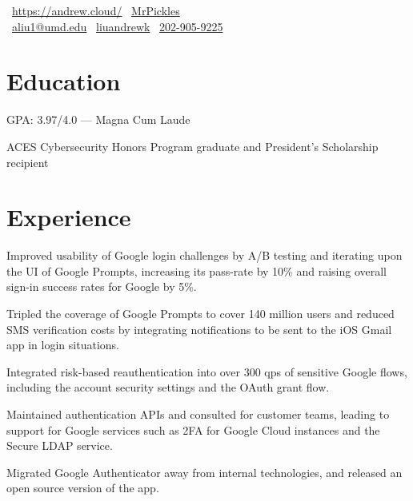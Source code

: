 \documentclass[]{template}
\begin{document}
\lastupdated

{
  \faHome \, \url{https://andrew.cloud/}
  \textcolor{black}{\textbullet}
  \faGithub \, \href{https://github.com/MrPickles}{MrPickles} \\
  \faEnvelope \, \href{mailto:aliu1@umd.edu}{aliu1@umd.edu}
  \textcolor{black}{\textbullet}
  \faLinkedin \, \href{https://linkedin.com/in/liuandrewk}{liuandrewk}
  \textcolor{black}{\textbullet}
  \faPhone \, \href{tel:2029059225}{202-905-9225}
}

\section{Education}
\begin{tightemize}
\item GPA: 3.97/4.0 --- Magna Cum Laude
\item ACES Cybersecurity Honors Program graduate and President's Scholarship recipient
\end{tightemize}
\sectionsep

\section{Experience}

\begin{tightemize}
\item Improved usability of Google login challenges by A/B testing and iterating upon the UI of Google Prompts, increasing its pass-rate by 10\% and raising overall sign-in success rates for Google by 5\%.
\item Tripled the coverage of Google Prompts to cover 140 million users and reduced SMS verification costs by integrating notifications to be sent to the iOS Gmail app in login situations.
\item Integrated risk-based reauthentication into over 300 qps of sensitive Google flows, including the account security settings and the OAuth grant flow.
\item Maintained authentication APIs and consulted for customer teams, leading to support for Google services such as 2FA for Google Cloud instances and the Secure LDAP service.
\item Migrated Google Authenticator away from internal technologies, and released an open source version of the app.
\end{tightemize}
\sectionsep
\end{document}
